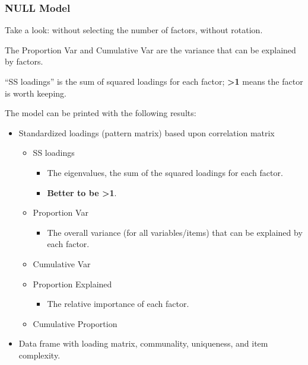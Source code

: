 \documentclass[
]{ctexart}
\providecommand{\tightlist}{%
  \setlength{\itemsep}{0pt}\setlength{\parskip}{0pt}}
\begin{document}
\hypertarget{null-model}{%
\subsubsection{NULL Model}\label{null-model}}

Take a look: without selecting the number of factors, without rotation.

The Proportion Var and Cumulative Var are the variance that can be
explained by factors.

``SS loadings'' is the sum of squared loadings for each factor;
\textbf{\textgreater1} means the factor is worth keeping.

The model can be printed with the following results:

\begin{itemize}
\tightlist
\item
  Standardized loadings (pattern matrix) based upon correlation matrix

  \begin{itemize}
  \tightlist
  \item
    SS loadings

    \begin{itemize}
    \tightlist
    \item
      The eigenvalues, the sum of the squared loadings for each factor.
    \item
      \textbf{Better to be \textgreater1}.
    \end{itemize}
  \item
    Proportion Var

    \begin{itemize}
    \tightlist
    \item
      The overall variance (for all variables/items) that can be
      explained by each factor.
    \end{itemize}
  \item
    Cumulative Var
  \item
    Proportion Explained

    \begin{itemize}
    \tightlist
    \item
      The relative importance of each factor.
    \end{itemize}
  \item
    Cumulative Proportion
  \end{itemize}
\item
  Data frame with loading matrix, communality, uniqueness, and item
  complexity.
\end{itemize}
\end{document}
